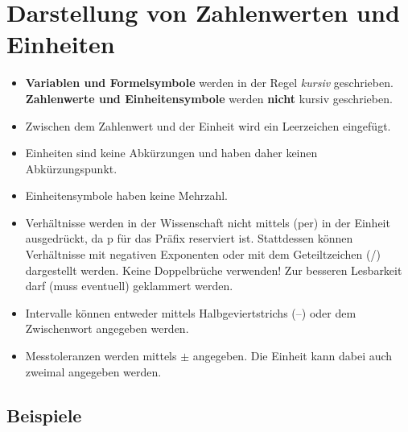 \section{Darstellung von Zahlenwerten und Einheiten}\label{sec: Zahlenwerte_Einheiten} 
\begin{itemize}
    \item \textbf{Variablen und Formelsymbole} werden in der Regel \textit{kursiv} geschrieben.\newline
    \textbf{Zahlenwerte und Einheitensymbole} werden \textbf{nicht} kursiv geschrieben.

    \item Zwischen dem Zahlenwert und der Einheit wird ein Leerzeichen eingefügt. 

    \item Einheiten sind keine Abkürzungen und haben daher keinen Abkürzungspunkt.

    \item Einheitensymbole haben keine Mehrzahl.

    \item Verhältnisse werden in der Wissenschaft nicht mittels  (per) in der Einheit ausgedrückt, da p für das Präfix  reserviert ist. 
    Stattdessen können Verhältnisse mit negativen Exponenten oder mit dem Geteiltzeichen (/) dargestellt werden. 
    Keine Doppelbrüche verwenden! Zur besseren Lesbarkeit darf (muss eventuell) geklammert werden.

    \item Intervalle können entweder mittels Halbgeviertstrichs (--) oder dem Zwischenwort  angegeben werden.

    \item Messtoleranzen werden mittels $\pm$ angegeben. Die Einheit kann dabei auch zweimal angegeben werden.
\end{itemize}

\subsection*{Beispiele}

